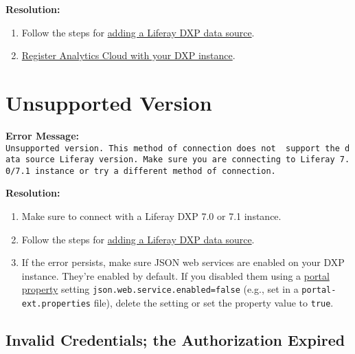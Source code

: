 \textbf{Resolution:}

\begin{enumerate}
\def\labelenumi{\arabic{enumi}.}
\item
  Follow the steps for
  \href{https://github.com/liferay/liferay-docs/blob/7.1.x/discover/analytics-cloud/articles/02-getting-started/02-adding-a-liferay-dxp-data-source.markdown}{adding
  a Liferay DXP data source}.
\item
  \href{https://github.com/liferay/liferay-docs/blob/7.1.x/discover/analytics-cloud/articles/02-getting-started/02-adding-a-liferay-dxp-data-source.markdown\#step-2-register-analytics-cloud-with-your-liferay-dxp-instance}{Register
  Analytics Cloud with your DXP instance}.
\end{enumerate}

\section{Unsupported Version}\label{unsupported-version}

\textbf{Error Message:}
\texttt{Unsupported\ version.\ This\ method\ of\ connection\ does\ not\ \ support\ the\ data\ source\ Liferay\ version.\ Make\ sure\ you\ are\ connecting\ to\ Liferay\ 7.0/7.1\ instance\ or\ try\ a\ different\ method\ of\ connection.}

\textbf{Resolution:}

\begin{enumerate}
\def\labelenumi{\arabic{enumi}.}
\item
  Make sure to connect with a Liferay DXP 7.0 or 7.1 instance.
\item
  Follow the steps for
  \href{https://github.com/liferay/liferay-docs/blob/7.1.x/discover/analytics-cloud/articles/02-getting-started/02-adding-a-liferay-dxp-data-source.markdown}{adding
  a Liferay DXP data source}.
\item
  If the error persists, make sure JSON web services are enabled on your
  DXP instance. They're enabled by default. If you disabled them using a
  \href{https://docs.liferay.com/dxp/portal/7.1-latest/propertiesdoc/portal.properties.html}{portal
  property} setting \texttt{json.web.service.enabled=false} (e.g., set
  in a \texttt{portal-ext.properties} file), delete the setting or set
  the property value to \texttt{true}.
\end{enumerate}

\subsection{Invalid Credentials; the Authorization
Expired}\label{invalid-credentials-the-authorization-expired}

